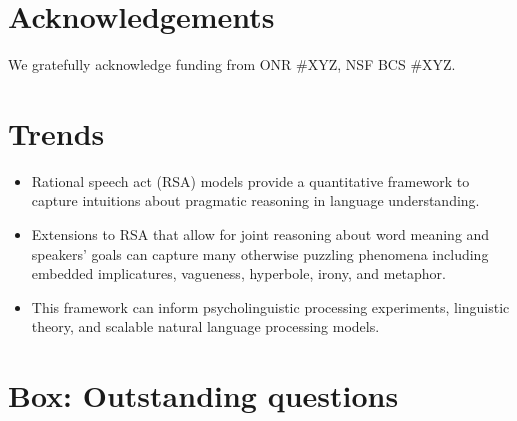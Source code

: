 \documentclass[]{elsarticle}
\begin{document}
\section{Acknowledgements}

We gratefully acknowledge funding from ONR \#XYZ, NSF BCS \#XYZ.




\newpage

\appendix




\section{Trends}\label{trends-box}

\begin{itemize}
\item
  Rational speech act (RSA) models provide a quantitative framework to
  capture intuitions about pragmatic reasoning in language
  understanding.
\item
  Extensions to RSA that allow for joint reasoning about word meaning
  and speakers' goals can capture many otherwise puzzling phenomena
  including embedded implicatures, vagueness, hyperbole, irony, and
  metaphor.
\item
  This framework can inform psycholinguistic processing experiments,
  linguistic theory, and scalable natural language processing models.
\end{itemize}

\section{Box: Outstanding questions}\label{box-outstanding-questions}
\end{document}
